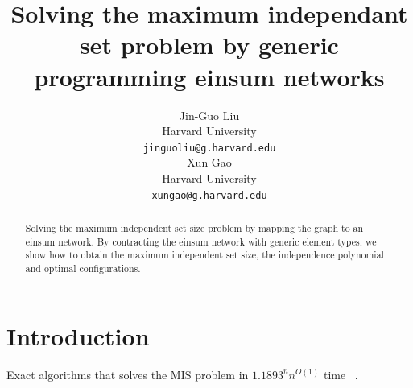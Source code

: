 \documentclass{article}
\newcommand{\<}{\langle}
\renewcommand{\>}{\rangle}
\renewcommand{\cite}[1]{{\citep{#1}}}
\theoremstyle{definition}\newtheorem{definition}{\textit{Definition}}
\begin{document}
\title{Solving the maximum independant set problem by generic programming einsum networks}

\author{Jin-Guo Liu\\
Harvard University\\
\texttt{jinguoliu@g.harvard.edu}\\
\AND
Xun Gao\\
Harvard University\\
\texttt{xungao@g.harvard.edu}\\
}
\maketitle

\begin{abstract}
	Solving the maximum independent set size problem by mapping the graph to an einsum network. 
    By contracting the einsum network with generic element types, we show how to obtain the maximum independent set size,
    the independence polynomial and optimal configurations.
\end{abstract}

\section{Introduction}
Exact algorithms that solves the MIS problem in $1.1893^n n ^{O(1)}$ time ~\cite{Xiao2017}.
\end{document}
